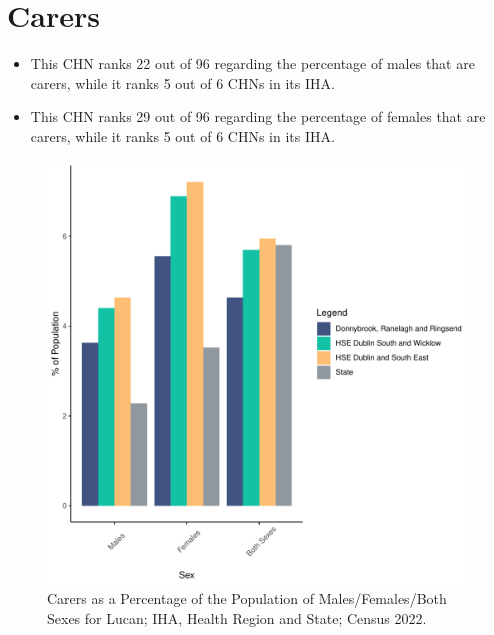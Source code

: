 \documentclass{article}
\begin{document}
\section{Carers}\label{sect:Carers}
\begin{itemize}
\item This CHN ranks  22 out of 96 regarding the percentage of males that are carers, while it ranks   5 out of 6 CHNs in its IHA.
\item This CHN ranks  29 out of 96 regarding the percentage of females that are carers, while it ranks   5 out of 6 CHNs in its IHA.
\end{itemize}
\begin{figure}[H]
	\centering
	\includegraphics[width = 150mm]{../figures/CareED.pdf}
	\caption{Carers as a Percentage of the Population of Males/Females/Both Sexes for Lucan; IHA, Health Region and State; Census 2022.}
	\label{fig:2ae19629-1a6a-13a3-e055-000000000001}
	\end{figure}
\end{document}
